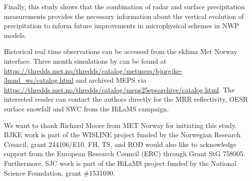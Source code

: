 \documentclass{ametsocV5}
\begin{document}
	Finally, this study shows that the combination of radar and surface precipitation measurements provides the necessary information about the vertical evolution of precipitation to inform future improvements in microphysical schemes in NWP models. 



%
\datastatement
Historical real time observations can be accessed from the eklima Met Norway interface.
Three month simulations by \citet{engdahl_effects_2020} can be found at \url{https://thredds.met.no/thredds/catalog/metusers/bjorgjke-3mnd_ws/catalog.html} and archived MEPS via \url{https://thredds.met.no/thredds/catalog/meps25epsarchive/catalog.html}. The interested reader can contact the authors directly for the MRR reflectivity, OESR surface snowfall and SWC from the HiLaMS campaign. 

%
\acknowledgments
We want to thank Richard Moore from MET Norway for initiating this study. BJKE work is part of the WISLINE project funded by the Norwegian Research Council, grant 244106/E10. FH, TS, and ROD would also like to acknowledge support from the European Research Council (ERC) through Grant StG 758005. Furthermore, SJC work is part of the HiLaMS project funded by the National Science Foundation, grant \#1531690. 





%


\end{document}

